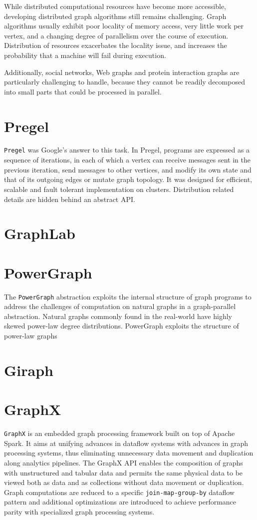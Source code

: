 \documentclass[letterpaper,twocolumn,10pt]{article}
\begin{document}
While distributed computational resources have become more accessible, developing distributed graph algorithms still remains challenging.
Graph algorithms usually exhibit poor locality of memory access, very little work per vertex, and a changing degree of parallelism over the course of execution. Distribution of resources exacerbates the locality issue, and increases the probability that a machine 
will fail during execution.

Additionally, social networks, Web graphs and protein interaction graphs are particularly challenging to handle, because they cannot be readily decomposed into small parts that could be processed in parallel.



\section{Pregel}
{\tt Pregel} was Google's answer to this task. In Pregel, programs are expressed as a sequence of iterations, in each of which a vertex can receive messages sent in the previous iteration, send messages to other vertices, and modify its own state and that of its outgoing edges or mutate graph topology. It was designed for efficient, scalable and fault tolerant implementation on clusters. Distribution related details are hidden behind an abstract API.

\section{GraphLab}

\section{PowerGraph}
The {\tt PowerGraph} abstraction exploits the internal structure of graph programs to address the challenges of computation on natural graphs in a graph-parallel abstraction. 
Natural graphs commonly found in the real-world have highly skewed power-law degree distributions.
PowerGraph exploits the structure of power-law graphs 

\section{Giraph}

\section{GraphX}
{\tt GraphX} is an embedded graph processing framework built on top of Apache Spark. It aims at unifying advances in dataflow systems with advances in graph processing systems, thus eliminating unnecessary data movement and duplication along analytics pipelines. The GraphX API enables the composition of graphs with unstructured and tabular data and permits the same physical data to be viewed both as data and as collections without data movement or duplication.
Graph computations are reduced to a specific {\tt join-map-group-by} dataflow pattern and additional optimizations are introduced to achieve performance parity with specialized graph processing systems.
\end{document}
